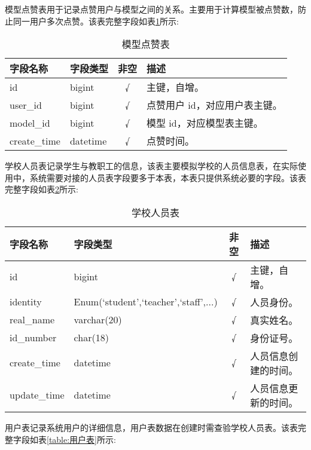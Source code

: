 模型点赞表用于记录点赞用户与模型之间的关系。主要用于计算模型被点赞数，防止同一用户多次点赞。该表完整字段如表\ref{table:模型点赞表}所示:

\begin{table}[H]
  \centering
  \small
  \caption{模型点赞表}
  \label{table:模型点赞表}
  \setlength{\tabcolsep}{9mm}
  \begin{tabular}{l|l|c|l}
    \toprule
    \textbf{字段名称} & \textbf{字段类型} & \textbf{非空} & \textbf{描述} \\
    \midrule
    id & bigint & √ & 主键，自增。 \\
    user\_id & bigint & √ & 点赞用户 id，对应用户表主键。 \\
    model\_id & bigint & √ & 模型 id，对应模型表主键。 \\
    create\_time & datetime & √ & 点赞时间。 \\
    \bottomrule
  \end{tabular}
\end{table}

学校人员表记录学生与教职工的信息，该表主要模拟学校的人员信息表，在实际使用中，系统需要对接的人员表字段要多于本表，本表只提供系统必要的字段。该表完整字段如表\ref{table:学校人员表}所示:

\begin{table}[H]
  \centering
  \small
  \caption{学校人员表}
  \label{table:学校人员表}
  \setlength{\tabcolsep}{6mm}
  \begin{tabular}{l|l|c|l}
    \toprule
    \textbf{字段名称} & \textbf{字段类型} & \textbf{非空} & \textbf{描述} \\
    \midrule
    id & bigint & √ & 主键，自增。 \\
    identity & Enum(`student',`teacher',`staff',...) & √ & 人员身份。 \\
    real\_name & varchar(20) & √ & 真实姓名。 \\
    id\_number & char(18) & √ & 身份证号。 \\
    create\_time & datetime & √ & 人员信息创建的时间。 \\
    update\_time & datetime & √ & 人员信息更新的时间。 \\
    \bottomrule
  \end{tabular}
\end{table}

用户表记录系统用户的详细信息，用户表数据在创建时需查验学校人员表。该表完整字段如表\ref{table:用户表}所示:

